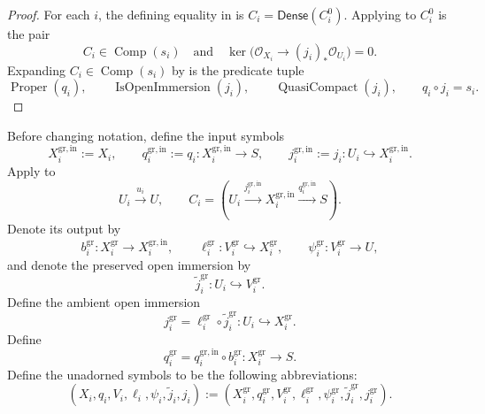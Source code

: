\begin{proof}
  For each $i$, the defining equality in
   is
  $C_i=\mathsf{Dense}(C_i^0)$.  Applying
   to $C_i^0$ is the pair
  \[
    C_i\in\operatorname{Comp}(s_i)
    \quad\text{and}\quad
    \ker\bigl(\mathcal O_{X_i}\to(j_i)_*\mathcal O_{U_i}\bigr)=0.
  \]
  Expanding $C_i\in\operatorname{Comp}(s_i)$ by
   is the predicate tuple
  \[
    \operatorname{Proper}(q_i),\qquad
    \operatorname{IsOpenImmersion}(j_i),\qquad
    \operatorname{QuasiCompact}(j_i),\qquad
    q_i\circ j_i=s_i.
  \]
\end{proof}

\begin{definition}
  \label{def:nagata-two-open-graph-extensions}

  Before changing notation, define the input symbols
  \[
    X_i^{\mathrm{gr,in}}:=X_i,\qquad
    q_i^{\mathrm{gr,in}}:=q_i\colon X_i^{\mathrm{gr,in}}\to S,\qquad
    j_i^{\mathrm{gr,in}}:=j_i\colon U_i\hookrightarrow X_i^{\mathrm{gr,in}}.
  \]
  Apply  to
  \[
    U_i\xrightarrow{u_i}U,\qquad
    C_i=(U_i\xrightarrow{j_i^{\mathrm{gr,in}}}X_i^{\mathrm{gr,in}}
      \xrightarrow{q_i^{\mathrm{gr,in}}}S).
  \]
  Denote its output by
  \[
    b_i^{\mathrm{gr}}\colon X_i^{\mathrm{gr}}\to X_i^{\mathrm{gr,in}},\qquad
    \ell_i^{\mathrm{gr}}\colon V_i^{\mathrm{gr}}\hookrightarrow
      X_i^{\mathrm{gr}},\qquad
    \psi_i^{\mathrm{gr}}\colon V_i^{\mathrm{gr}}\to U,
  \]
  and denote the preserved open immersion by
  \[
    \widetilde j_i^{\mathrm{gr}}\colon
      U_i\hookrightarrow V_i^{\mathrm{gr}}.
  \]
  Define the ambient open immersion
  \[
    j_i^{\mathrm{gr}}
      =\ell_i^{\mathrm{gr}}\circ\widetilde j_i^{\mathrm{gr}}
      \colon U_i\hookrightarrow X_i^{\mathrm{gr}}.
  \]
  Define
  \[
    q_i^{\mathrm{gr}}=q_i^{\mathrm{gr,in}}\circ b_i^{\mathrm{gr}}
      \colon X_i^{\mathrm{gr}}\to S.
  \]
  Define the unadorned symbols to be the following abbreviations:
  \[
    (X_i,q_i,V_i,\ell_i,\psi_i,\widetilde j_i,j_i)
      :=
    (X_i^{\mathrm{gr}},q_i^{\mathrm{gr}},V_i^{\mathrm{gr}},
      \ell_i^{\mathrm{gr}},\psi_i^{\mathrm{gr}},
      \widetilde j_i^{\mathrm{gr}},j_i^{\mathrm{gr}}).
  \]
\end{definition}

